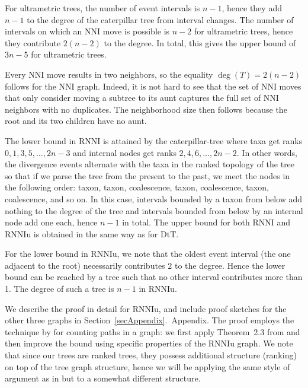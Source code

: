 \documentclass[11pt]{amsart}
\theoremstyle{definition}
\newcommand{\nni}{\mathrm{NNI}}
\newcommand{\rnni}{\mathrm{RNNI}}
\newcommand{\rnniu}{\mathrm{RNNIu}}
\newcommand{\dtt}{\mathrm{DtT}}
\begin{document}
For ultrametric trees, the number of event intervals is $n-1$, hence they add $n-1$ to the degree of the caterpillar tree from interval changes.
The number of intervals on which an $\nni$ move is possible is $n-2$ for ultrametric trees, hence they contribute $2(n-2)$ to the degree.
In total, this gives the upper bound of $3n-5$ for ultrametric trees.

Every $\nni$ move results in two neighbors, so the equality $\deg(T) = 2(n-2)$ follows for the $\nni$ graph.
Indeed, it is not hard to see that the set of $\nni$ moves that only consider moving a subtree to its aunt captures the full set of $\nni$ neighbors with no duplicates.
The neighborhood size then follows because the root and its two children have no aunt.

The lower bound in $\rnni$ is attained by the caterpillar-tree where taxa get ranks $0, 1, 3, 5, \ldots, 2n-3$ and internal nodes get ranks $2, 4, 6, \ldots, 2n-2$.
In other words, the divergence events alternate with the taxa in the ranked topology of the tree so that if we parse the tree from the present to the past, we meet the nodes in the following order: taxon, taxon, coalescence, taxon, coalescence, taxon, coalescence, and so on.
In this case, intervals bounded by a taxon from below add nothing to the degree of the tree and intervals bounded from below by an internal node add one each, hence $n-1$ in total.
The upper bound for both $\rnni$ and $\rnniu$ is obtained in the same way as for $\dtt$.

For the lower bound in $\rnniu$, we note that the oldest event interval (the one adjacent to the root) necessarily contributes $2$ to the degree.
Hence the lower bound can be reached by a tree such that no other interval contributes more than 1.
The degree of such a tree is $n-1$ in $\rnniu$.
\endproof

We describe the proof in detail for $\rnniu$, and include proof sketches for the other three graphs in Section~\ref{secAppendix}.\ Appendix.
The proof employs the technique by \textcite{Sleator1992-bp} for counting paths in a graph: we first apply Theorem~2.3 from \autocite{Sleator1992-bp} and then improve the bound using specific properties of the $\rnniu$ graph.
We note that since our trees are ranked trees, they possess additional structure (ranking) on top of the tree graph structure, hence we will be applying the same style of argument as in \autocite{Sleator1992-bp} but to a somewhat different structure.
\end{document}
